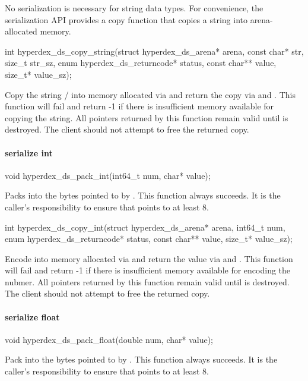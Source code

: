 No serialization is necessary for string data types.  For convenience, the
serialization API provides a copy function that copies a string into
arena-allocated memory.

\begin{ccode}
int hyperdex_ds_copy_string(struct hyperdex_ds_arena* arena, const char* str,
                            size_t str_sz, enum hyperdex_ds_returncode* status,
                            const char** value, size_t* value_sz);
\end{ccode}
\funcdesc  Copy the string / into memory allocated via
 and return the copy via  and .  This
function will fail and return -1 if there is insufficient memory available for
copying the string.  All pointers returned by this function remain valid until
 is destroyed.  The client should not attempt to free the returned
copy.

\paragraph{serialize int}

\begin{ccode}
void hyperdex_ds_pack_int(int64_t num, char* value);
\end{ccode}
\funcdesc Packs  into the bytes pointed to by .  This
function always succeeds.  It is the caller's responsibility to ensure that
 points to at least \unit{8}{\byte}.

\funcsep
\begin{ccode}
int hyperdex_ds_copy_int(struct hyperdex_ds_arena* arena, int64_t num,
                         enum hyperdex_ds_returncode* status,
                         const char** value, size_t* value_sz);
\end{ccode}
\funcdesc Encode  into memory allocated via  and return
the value via  and .  This function will fail and
return -1 if there is insufficient memory available for encoding the nubmer.
All pointers returned by this function remain valid until  is
destroyed.  The client should not attempt to free the returned copy.

\paragraph{serialize float}

\begin{ccode}
void hyperdex_ds_pack_float(double num, char* value);
\end{ccode}
\funcdesc Pack  into the bytes pointed to by .  This
function always succeeds.  It is the caller's responsibility to ensure that
 points to at least \unit{8}{\byte}.

